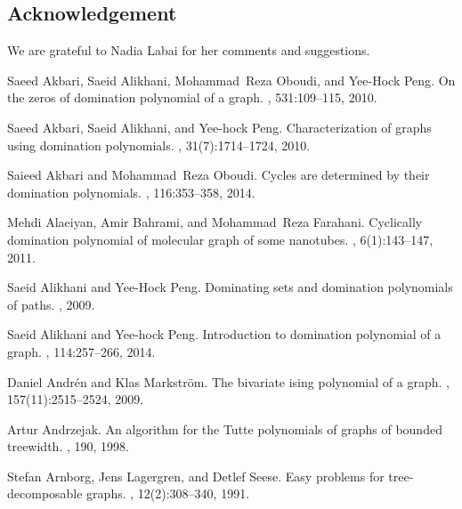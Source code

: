 \documentclass{llncs}
\begin{document}
\subsection*{Acknowledgement}
We are grateful to Nadia Labai for her comments and suggestions. 

\begin{thebibliography}{10}

Saeed Akbari, Saeid Alikhani, Mohammad~Reza Oboudi, and Yee-Hock Peng.
\newblock On the zeros of domination polynomial of a graph.
, 531:109--115, 2010.

Saeed Akbari, Saeid Alikhani, and Yee-hock Peng.
\newblock Characterization of graphs using domination polynomials.
, 31(7):1714--1724, 2010.

Saieed Akbari and Mohammad~Reza Oboudi.
\newblock Cycles are determined by their domination polynomials.
, 116:353--358, 2014.

Mehdi Alaeiyan, Amir Bahrami, and Mohammad~Reza Farahani.
\newblock Cyclically domination polynomial of molecular graph of some
  nanotubes.
,
  6(1):143--147, 2011.

Saeid Alikhani and Yee-Hock Peng.
\newblock Dominating sets and domination polynomials of paths.
,
  2009.

Saeid Alikhani and Yee-hock Peng.
\newblock Introduction to domination polynomial of a graph.
, 114:257--266, 2014.

Daniel Andr{\'e}n and Klas Markstr{\"o}m.
\newblock The bivariate ising polynomial of a graph.
, 157(11):2515--2524, 2009.

Artur Andrzejak.
\newblock An algorithm for the {T}utte polynomials of graphs of bounded
  treewidth.
, 190, 1998.

Stefan Arnborg, Jens Lagergren, and Detlef Seese.
\newblock Easy problems for tree-decomposable graphs.
, 12(2):308--340, 1991.


\end{thebibliography}
\end{document}
